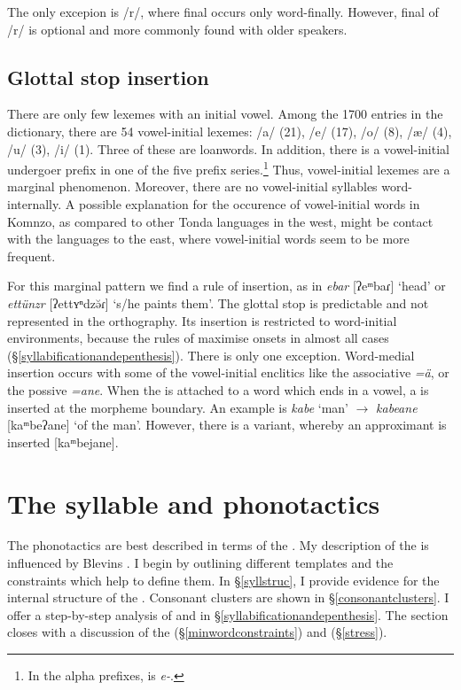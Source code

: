 The only excepion is /r/, where final  occurs only word-finally. However, final  of /r/ is optional and more commonly found with older speakers.

\subsection{Glottal stop insertion} \label{glottal-stop-insertion-section}

There are only few lexemes with an initial vowel. Among the 1700 entries in the dictionary, there are 54 vowel-initial lexemes: /a/ (21), /e/ (17), /o/ (8), /æ/ (4), /u/ (3), /i/ (1). Three of these are loanwords. In addition, there is a vowel-initial undergoer prefix in one of the five prefix series.\footnote{In the alpha prefixes, {\Stnsg} is \emph{e-}.} Thus, vowel-initial lexemes are a marginal phenomenon. Moreover, there are no vowel-initial syllables word-internally. A possible explanation for the occurence of vowel-initial words in Komnzo, as compared to other Tonda languages in the west, might be contact with the  languages to the east, where vowel-initial words seem to be more frequent.

For this marginal pattern we find a rule of  insertion, as in \emph{ebar} [ʔeᵐbaɾ] `head' or \emph{ettünzr} [ʔettʏⁿdzə̆ɾ] `s/he paints them'. The glottal stop is predictable and not represented in the orthography. Its insertion is restricted to word-initial environments, because the rules of  maximise onsets in almost all cases ({\S}\ref{syllabificationandepenthesis}). There is only one exception. Word-medial  insertion occurs with some of the vowel-initial enclitics like the associative \emph{=ä}, or the possive \emph{=ane}. When the  is attached to a word which ends in a vowel, a  is inserted at the morpheme boundary. An example is \emph{kabe} `man' $\rightarrow$ \emph{kabeane} [kaᵐbeʔane] `of the man'. However, there is a variant, whereby an approximant is inserted [kaᵐbejane].

\section{The syllable and phonotactics} \label{syllable-and-phonotactics}

The phonotactics are best described in terms of the . My description of the  is influenced by Blevins \citeyearpar{Blevins:1995tt}. I begin by outlining different  templates and the constraints which help to define them. In {\S}\ref{syllstruc}, I provide evidence for the internal structure of the . Consonant clusters are shown in \S\ref{consonantclusters}. I offer a step-by-step analysis of  and  in {\S}\ref{syllabificationandepenthesis}. The section closes with a discussion of the  (\S\ref{minwordconstraints}) and  ({\S}\ref{stress}).

